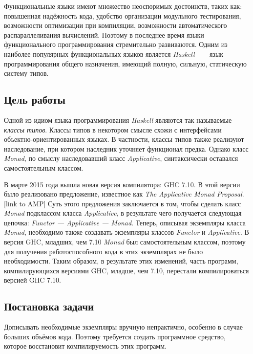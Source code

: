 






\Intro

Функциональные языки имеют множество неоспоримых достоинств, таких как: повышенная надёжность кода, удобство организации модульного тестирования, возможности оптимизации при компиляции, возможности автоматического распараллеливания вычислений. Поэтому в последнее время языки функционального программирования стремительно развиваются. Одним из наиболее популярных функциональных языков является \textit{Haskell} ~---  язык программирования общего назначения, имеющий полную, сильную, статическую систему типов.

\subsection*{Цель работы}
Одной из идиом языка программирования \textit{Haskell} являются так называемые \textit{классы типов}. Классы типов в некотором смысле схожи с интерфейсами  объектно-ориентированных языках. В частности, классы типов также реализуют наследование, при котором наследник уточняет функционал предка. Однако класс \textit{Monad}, по смыслу наследовавший класс \textit{Applicative}, синтаксически оставался самостоятельным классом.

В марте 2015 года вышла новая версия компилятора: GHC 7.10. В этой версии было реализовано предложение, известное как \textit{The Applicative Monad Proposal}.[link to AMP] Суть этого предложения заключается в том, чтобы сделать класс \textit{Monad} подклассом класса \textit{Applicative}, в результате чего получается следующая цепочка: \textit{Functor --- Applicative --- Monad}. Теперь, описывая экземпляры класса \textit{Monad}, необходимо также создавать экземпляры классов \textit{Functor} и \textit{Applicative}. В версия GHC, младших, чем 7.10 \textit{Monad} был самостоятельным классом, поэтому для получения работоспособного кода в этих экземплярах не было необходимости. Таким образом, в результате этих изменений, часть программ, компилирующихся версиями GHC, младше, чем 7.10, перестали компилироваться версией GHC 7.10.

\subsection*{Постановка задачи}
Дописывать необходимые экземпляры вручную непрактично, особенно в случае больших объёмов кода. Поэтому требуется создать программное средство, которое восстановит компилируемость этих программ.

